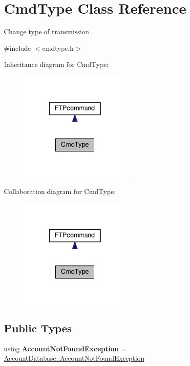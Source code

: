 \hypertarget{classCmdType}{}\section{Cmd\+Type Class Reference}
\label{classCmdType}


Change type of transmission.  




{\ttfamily \#include $<$cmdtype.\+h$>$}



Inheritance diagram for Cmd\+Type\+:
\nopagebreak
\begin{figure}[H]
\begin{center}
\leavevmode
\includegraphics[width=158pt]{classCmdType__inherit__graph}
\end{center}
\end{figure}


Collaboration diagram for Cmd\+Type\+:
\nopagebreak
\begin{figure}[H]
\begin{center}
\leavevmode
\includegraphics[width=158pt]{classCmdType__coll__graph}
\end{center}
\end{figure}
\subsection*{Public Types}
\begin{DoxyCompactItemize}
\item 
\mbox{\label{classCmdType_a3183eef703d97624611bf756a58ee5fa}} 
using {\bfseries Account\+Not\+Found\+Exception} = \hyperlink{structAccountDatabase_1_1AccountNotFoundException}{Account\+Database\+::\+Account\+Not\+Found\+Exception}
\end{DoxyCompactItemize}
